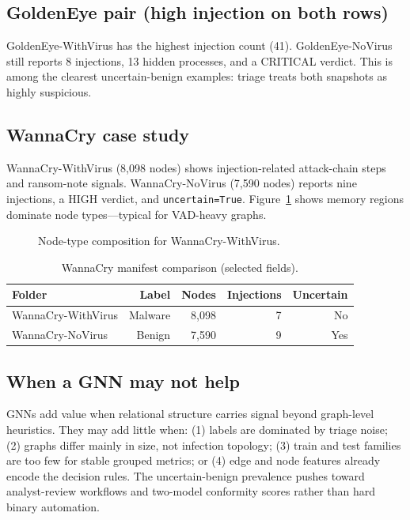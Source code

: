 \subsection{GoldenEye pair (high injection on both rows)}

GoldenEye-WithVirus has the highest injection count (41). GoldenEye-NoVirus still reports 8 injections, 13 hidden processes, and a CRITICAL verdict. This is among the clearest uncertain-benign examples: triage treats both snapshots as highly suspicious.

\subsection{WannaCry case study}

WannaCry-WithVirus (8,098 nodes) shows injection-related attack-chain steps and ransom-note signals. WannaCry-NoVirus (7,590 nodes) reports nine injections, a HIGH verdict, and \texttt{uncertain=True}. Figure~\ref{fig:wannacry_nodes} shows memory regions dominate node types---typical for VAD-heavy graphs.

\begin{figure}[htbp]
\centering

\caption{Node-type composition for WannaCry-WithVirus.}
\label{fig:wannacry_nodes}
\end{figure}

\begin{table}[htbp]
\centering
\caption{WannaCry manifest comparison (selected fields).}
\label{tab:wannacry_compare}
\begin{tabular}{lrrrr}
\toprule
\textbf{Folder} & \textbf{Label} & \textbf{Nodes} & \textbf{Injections} & \textbf{Uncertain} \\
\midrule
WannaCry-WithVirus & Malware & 8,098 & 7 & No \\
WannaCry-NoVirus & Benign & 7,590 & 9 & Yes \\
\bottomrule
\end{tabular}
\end{table}

\subsection{When a GNN may not help}

GNNs add value when relational structure carries signal beyond graph-level heuristics. They may add little when: (1) labels are dominated by triage noise; (2) graphs differ mainly in size, not infection topology; (3) train and test families are too few for stable grouped metrics; or (4) edge and node features already encode the decision rules. The uncertain-benign prevalence pushes toward analyst-review workflows and two-model conformity scores rather than hard binary automation.

